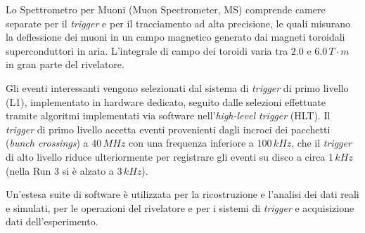 \documentclass[11pt]{article}
\begin{document}
Lo Spettrometro per Muoni (Muon Spectrometer, MS) comprende camere separate per il \textit{trigger} e per il tracciamento ad alta precisione, le quali misurano la deflessione dei muoni in un campo magnetico generato dai magneti toroidali superconduttori in aria. L'integrale di campo dei toroidi varia tra $2.0$ e $6.0\,\unit{T\cdot m}$ in gran parte del rivelatore.

Gli eventi interessanti vengono selezionati dal sistema di \textit{trigger} di primo livello (L1), implementato in hardware dedicato, seguito dalle selezioni effettuate tramite algoritmi implementati via software nell'\textit{high-level trigger} (HLT). Il \textit{trigger} di primo livello accetta eventi provenienti dagli incroci dei pacchetti (\textit{bunch crossings}) a $40\,\unit{MHz}$ con una frequenza inferiore a $100\,\unit{kHz}$, che il \textit{trigger} di alto livello riduce ulteriormente per registrare gli eventi su disco a circa $1\,\unit{kHz}$ (nella Run 3 si è alzato a $3\,\unit{kHz}$).

Un'estesa suite di software è utilizzata per la ricostruzione e l'analisi dei dati reali e simulati, per le operazioni del rivelatore e per i sistemi di \textit{trigger} e acquisizione dati dell'esperimento.
\end{document}
